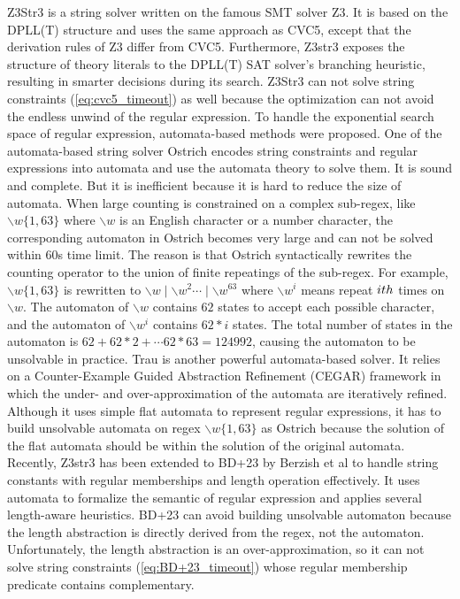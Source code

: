 {Z3Str3\cite{z3str3} is a string solver written on the famous SMT solver Z3\cite{Z3}. It is based on the DPLL(T) structure and uses the same approach as CVC5, except that the derivation rules of Z3 differ from CVC5. Furthermore, Z3str3 exposes the structure of theory literals to the DPLL(T) SAT solver's branching heuristic, resulting in smarter decisions during its search. Z3Str3 can not solve string constraints (\ref{eq:cvc5_timeout}) as well because the optimization can not avoid the endless unwind of the regular expression. To handle the exponential search space of regular expression, automata-based methods were proposed. One of the automata-based string solver Ostrich\cite{ostrich}\cite{atva2020} encodes string constraints and regular expressions into automata and use the automata theory to solve them. It is sound and complete. But it is inefficient because it is hard to reduce the size of automata. When large counting is constrained on a complex sub-regex, like $ \backslash w \{1, 63\}$ where $\backslash w$ is an English character or a number character, the corresponding automaton in Ostrich becomes very large and can not be solved within 60s time limit. The reason is that Ostrich syntactically rewrites the counting operator to the union of finite repeatings of the sub-regex. For example, $\backslash w\{1, 63\}$ is rewritten to $\backslash w\mid\backslash w^2\cdots\mid\backslash w^{63}$ where $\backslash w^i$ means repeat $i\-th$ times on $\backslash w$. The automaton of $\backslash w$ contains $62$ states to accept each possible character, and the automaton of $\backslash w ^i$ contains $62*i$ states. The total number of states in the automaton is $62 + 62*2 + \cdots 62*63=124992$, causing the automaton to be unsolvable in practice. Trau\cite{z3trau}\cite{trau+} is another powerful automata-based solver. It relies on a Counter-Example Guided Abstraction Refinement (CEGAR) framework in which the under- and over-approximation of the automata are iteratively refined. Although it uses simple flat automata to represent regular expressions, it has to build unsolvable automata on regex $\backslash w\{1, 63\}$ as Ostrich because the solution of the flat automata should be within the solution of the original automata. 
Recently, Z3str3 has been extended to BD+23\cite{BD+23} by Berzish et al to handle string constants with regular memberships and length operation effectively. It uses automata to formalize the semantic of regular expression and applies several length-aware heuristics. BD+23 can avoid building unsolvable automaton because the length abstraction is directly derived from the regex, not the automaton. Unfortunately, the length abstraction is an over-approximation, so it can not solve string constraints (\ref{eq:BD+23_timeout}) whose regular membership predicate contains complementary.
}

